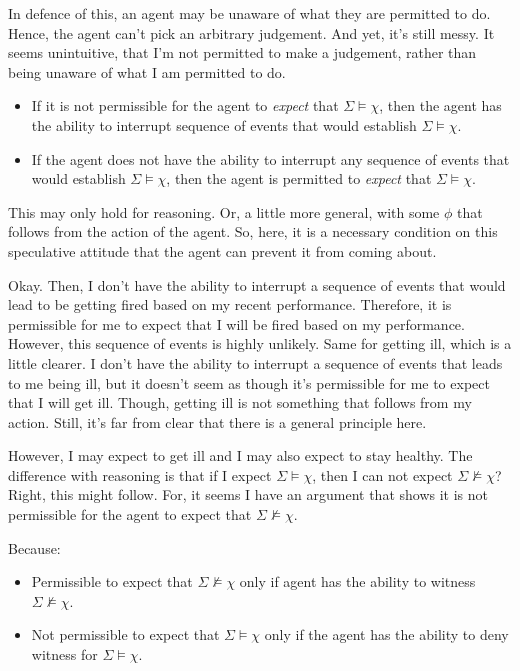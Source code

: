 \documentclass[10pt]{article}
\begin{document}
In defence of this, an agent may be unaware of what they are permitted to do.
Hence, the agent can't pick an arbitrary judgement.
And yet, it's still messy.
It seems unintuitive, that I'm not permitted to make a judgement, rather than being unaware of what I am permitted to do. 

\newpage

\begin{itemize}
\item If it is not permissible for the agent to \emph{expect} that \(\Sigma \vDash \chi\), then the agent has the ability to interrupt sequence of events that would establish \(\Sigma \vDash \chi\).
\item If the agent does not have the ability to interrupt any sequence of events that would establish \(\Sigma \vDash \chi\), then the agent is permitted to \emph{expect} that \(\Sigma \vDash \chi\).
\end{itemize}

This may only hold for reasoning.
Or, a little more general, with some \(\phi\) that follows from the action of the agent.
So, here, it is a necessary condition on this speculative attitude that the agent can prevent it from coming about.

Okay.
Then, I don't have the ability to interrupt a sequence of events that would lead to be getting fired based on my recent performance.
Therefore, it is permissible for me to expect that I will be fired based on my performance.
However, this sequence of events is highly unlikely.
Same for getting ill, which is a little clearer.
I don't have the ability to interrupt a sequence of events that leads to me being ill, but it doesn't seem as though it's permissible for me to expect that I will get ill.
Though, getting ill is not something that follows from my action.
Still, it's far from clear that there is a general principle here.

However, I may expect to get ill and I may also expect to stay healthy.
The difference with reasoning is that if I expect \(\Sigma \vDash \chi\), then I can not expect \(\Sigma \nvDash \chi\)?
Right, this might follow.
For, it seems I have an argument that shows it is not permissible for the agent to expect that \(\Sigma \nvDash \chi\).

Because:
\begin{itemize}
\item Permissible to expect that \(\Sigma \nvDash \chi\) only if agent has the ability to witness \(\Sigma \nvDash \chi\).
\item Not permissible to expect that \(\Sigma \vDash \chi\) only if the agent has the ability to deny witness for \(\Sigma \vDash \chi\).
\end{itemize}
\end{document}
